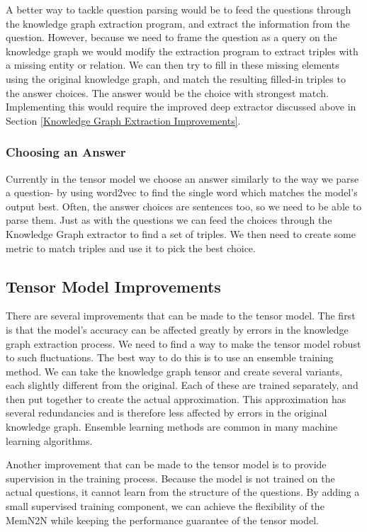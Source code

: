 \documentclass[pageno]{final_paper}
\begin{document}
A better way to tackle question parsing would be to feed the questions through
the knowledge graph extraction program, and extract the information from the
question. However, because we need to frame the question as a query on the
knowledge graph we would modify the extraction program to extract triples with a
missing entity or relation. We can then try to fill in these missing elements
using the original knowledge graph, and match the resulting filled-in triples to
the answer choices. The answer would be the choice with strongest match.
Implementing this would require the improved deep extractor discussed above in
Section \ref{Knowledge Graph Extraction Improvements}.

\subsubsection{Choosing an Answer}
\label{Choosing an Answer}

Currently in the tensor model we choose an answer similarly to the way we parse
a question- by using word2vec to find the single word which matches the model's
output best. Often, the answer choices are sentences too, so we need to be able
to parse them. Just as with the questions we can feed the choices through the
Knowledge Graph extractor to find a set of triples. We then need to create some
metric to match triples and use it to pick the best choice.

\subsection{Tensor Model Improvements}
\label{Tensor Model Improvements}

There are several improvements that can be made to the tensor model. The first
is that the model's accuracy can be affected greatly by errors in the knowledge
graph extraction process. We need to find a way to make the tensor model robust
to such fluctuations. The best way to do this is to use an ensemble training
method. We can take the knowledge graph tensor and create several variants, each
slightly different from the original. Each of these are trained separately, and
then put together to create the actual approximation. This approximation has
several redundancies and is therefore less affected by errors in the original
knowledge graph. Ensemble learning methods are common in many machine learning
algorithms.

Another improvement that can be made to the tensor model is to provide
supervision in the training process. Because the model is not trained on the
actual questions, it cannot learn from the structure of the questions. By adding
a small supervised training component, we can achieve the flexibility of the
MemN2N while keeping the performance guarantee of the tensor model.
\end{document}
